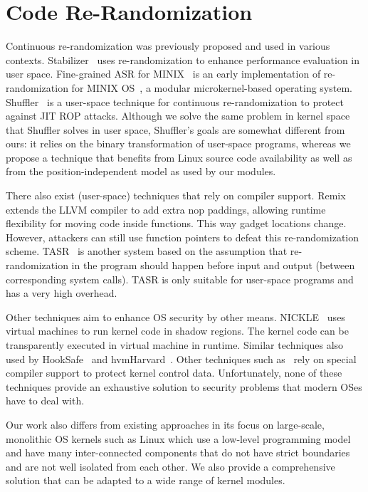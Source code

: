 \section{Code Re-Randomization}
Continuous re\hyp{}randomization was previously proposed and used in various contexts.
Stabilizer~\cite{STABILIZER} uses re\hyp{}randomization to enhance performance evaluation in user space.
Fine-grained ASR for MINIX~\cite{ASRMINIX} is an early implementation of
re\hyp{}randomization for MINIX OS~\cite{MINIX}, a modular microkernel-based operating system.
Shuffler~\cite{SHUFFLER} is a user-space technique for continuous re\hyp{}randomization to protect against JIT ROP attacks.
Although we solve the same problem in kernel space that Shuffler solves in user space, Shuffler's goals are somewhat different from ours: it relies on the binary transformation of user-space programs,
whereas we propose a technique that benefits from Linux source code availability
as well as from the position-independent model as used by our modules.

There also exist (user-space) techniques that rely on compiler support. Remix~\cite{REMIX}
extends the LLVM compiler to add extra nop paddings, allowing runtime flexibility
for moving code inside functions. This way gadget locations change. However, attackers
can still use function pointers to defeat this re\hyp{}randomization scheme.
TASR~\cite{TASR} is another system based on the assumption that re\hyp{}randomization in the
program should happen before input and output (between corresponding system calls).
TASR is only suitable for user-space programs and has a very high overhead.

Other techniques aim to enhance OS security by other means. NICKLE~\cite{KERNELROOTKITS}
uses virtual machines to run kernel code in shadow regions. The kernel code can be transparently
executed in virtual machine in runtime. Similar techniques also used by HookSafe~\cite{HOOKSAFE}
and hvmHarvard~\cite{HVMHARVARD}.
Other techniques such as~\cite{KERNELCONTROLDATA} rely on
special compiler support to protect kernel control data.
Unfortunately, none of these techniques provide an exhaustive solution to security
problems that modern OSes have to deal with.

Our work also differs from existing approaches in its focus on large-scale, monolithic OS
kernels such as Linux which use a low-level programming model and have many inter-connected
components that do not have strict boundaries and are not well isolated from each other.
We also provide a comprehensive solution that can be adapted to a wide range of kernel modules.

